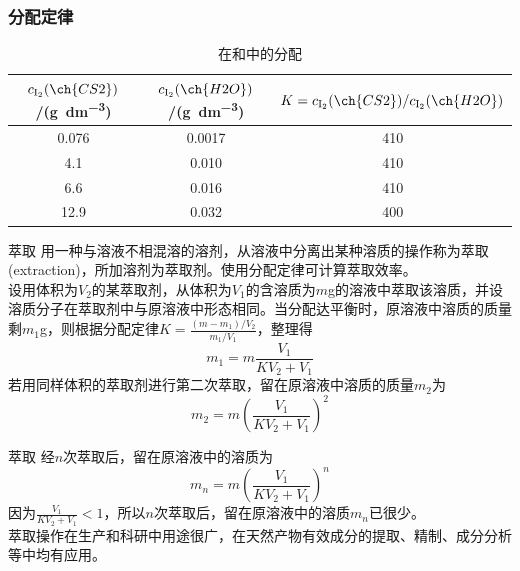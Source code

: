 \begin{frame}
    \frametitle{分配定律}
    \begin{table}
        \centering
        \caption{在和中的分配}
        \begin{tabular}{ccc}
            \bottomrule
            \rowcolor{maincolor!10}
            $c_\mathrm{I_2}(\ch{CS2})$/(\si{g.dm^{-3}}) & $c_\mathrm{I_2}(\ch{H2O})$/(\si{g.dm^{-3}}) & $K=c_\mathrm{I_2}(\ch{CS2})/c_\mathrm{I_2}(\ch{H2O})$ \\ \hline
            0.076 & 0.0017 & 410 \\ \hline
            4.1 & 0.010 & 410 \\ \hline
            6.6 & 0.016 & 410 \\ \hline
            12.9 & 0.032 & 400 \\ \toprule
        \end{tabular}
    \end{table}
\end{frame}


\begin{frame}{萃取}
    用一种与溶液不相混溶的溶剂，从溶液中分离出某种溶质的操作称为萃取(extraction)，所加溶剂为萃取剂。使用分配定律可计算萃取效率。
    \\设用体积为$V_2$的某萃取剂，从体积为$V_1$的含溶质为$m$g的溶液中萃取该溶质，并设溶质分子在萃取剂中与原溶液中形态相同。当分配达平衡时，原溶液中溶质的质量剩$m_1$g，则根据分配定律$K=\frac{\left(m-m_{1}\right) / V_{2}}{m_{1} / V_{1}}$，整理得
    $$m_{1}=m\frac{V_{1}}{K V_{2}+V_{1}}$$
    若用同样体积的萃取剂进行第二次萃取，留在原溶液中溶质的质量$m_2$为
    $$m_{2}=m\left(\frac{V_{1}}{K V_{2}+V_{1}}\right)^{2}$$
\end{frame}


\begin{frame}{萃取}
    经$n$次萃取后，留在原溶液中的溶质为
    $$m_{n}=m\left(\frac{V_{1}}{K V_{2}+V_{1}}\right)^{n}$$
    因为$\frac{V_{1}}{K V_{2}+V_{1}}<1$，所以$n$次萃取后，留在原溶液中的溶质$m_n$已很少。
    \\萃取操作在生产和科研中用途很广，在天然产物有效成分的提取、精制、成分分析等中均有应用。
\end{frame}